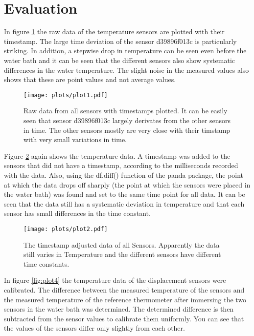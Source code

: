 \section{Evaluation}
\label{sec:evaluation}
In figure \ref{fig:plot1} the raw data of the temperature sensors are plotted with their timestamp. 
The large time deviation of the sensor d39896f013c is particularly striking.
In addition, a stepwise drop in temperature can be seen even before the water bath and it can be seen that the different sensors also show systematic differences in the water temperature.
The slight noise in the measured values also shows that these are point values and not average values.

\begin{figure}
    \centering 
    \texttt{[image: plots/plot1.pdf]}
    \caption{Raw data from all sensors with timestamps plotted. It can be easily seen that sensor d39896f013c largely derivates from the other sensors in time. The other sensors mostly are very close with their timstamp with very small variations in time.}
    \label{fig:plot1}
\end{figure}
Figure \ref{fig:plot2} again shows the temperature data. A timestamp was added to the sensors that did not have a timestamp, according to the milliseconds recorded with the data. Also, using the df.diff() function of the panda package, the point at which the data drops off sharply (the point at which the sensors were placed in the water bath) was found and set to the same time point for all data. It can be seen that the data still has a systematic deviation in temperature and that each sensor has small differences in the time constant.\\

\begin{figure}
    \centering 
    \texttt{[image: plots/plot2.pdf]}
    \caption{The timestamp adjusted data of all Sensors. Apparently the data still varies in Temperature and the different sensors have different time constants.}
    \label{fig:plot2}
\end{figure}
In figure \ref{fig:plot4} the temperature data of the displacement sensors were calibrated. The difference between the measured temperature of the sensors and the measured temperature of the reference thermometer after immersing the two sensors in the water bath was determined.
The determined difference is then subtracted from the sensor values to calibrate them uniformly.
You can see that the values of the sensors differ only slightly from each other. \\

